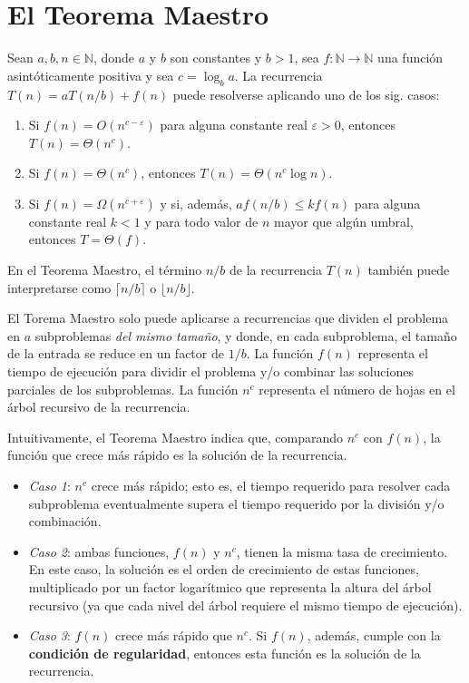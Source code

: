 \newpage
\section{El Teorema Maestro}

\begin{thm}
  Sean \(a,b,n\in\mathbb{N}\), donde \(a\) y \(b\) son constantes y \(b>1\), sea \(f:\mathbb{N}\to\mathbb{N}\) una función asintóticamente positiva y sea \(c=\log_{b}a\). 
  La recurrencia \(T(n)=aT(n/b)+f(n)\) puede resolverse aplicando uno de los sig. casos:
  \begin{enumerate}
    \item Si \(f(n)=O(n^{c-\varepsilon})\) para alguna constante real $\varepsilon>0$, entonces \(T(n)=\Theta(n^{c})\).
    \item Si \(f(n)=\Theta(n^c)\), entonces \(T(n)=\Theta(n^{c}\log{n})\).
    \item Si \(f(n)=\Omega(n^{c+\varepsilon})\) y si, además, \(af(n/b)\leq kf(n)\) para alguna constante real \(k<1\) y para todo valor de \(n\) mayor que algún umbral, entonces \(T=\Theta(f)\).
  \end{enumerate}
\end{thm}

\begin{rem}
  En el Teorema Maestro, el término \(n/b\) de la recurrencia \(T(n)\) también puede interpretarse como \(\lceil n/b\rceil\) o \(\lfloor n/b\rfloor\).
\end{rem}

El Torema Maestro solo puede aplicarse a recurrencias que dividen el problema en \(a\) subproblemas \emph{del mismo tamaño}, y donde, en cada subproblema, el tamaño de la entrada se reduce en un factor de \(1/b\).
La función \(f(n)\) representa el tiempo de ejecución para dividir el problema y/o combinar las soluciones parciales de los subproblemas.
La función \(n^c\) representa el número de hojas en el árbol recursivo de la recurrencia.

Intuitivamente, el Teorema Maestro indica que, comparando \(n^c\) con \(f(n)\), la función que crece más rápido es la solución de la recurrencia.
\begin{itemize}
  \item \textit{Caso 1}: \(n^c\) crece más rápido; esto es, el tiempo requerido para resolver cada subproblema eventualmente supera el tiempo requerido por la división y/o combinación.
  \item \textit{Caso 2}: ambas funciones, \(f(n)\) y \(n^c\), tienen la misma tasa de crecimiento.
  En este caso, la solución es el orden de crecimiento de estas funciones, multiplicado por un factor logarítmico que representa la altura del árbol recursivo (ya que cada nivel del árbol requiere el mismo tiempo de ejecución).
  \item \textit{Caso 3}: \(f(n)\) crece más rápido que \(n^c\). 
  Si \(f(n)\), además, cumple con la \textbf{condición de regularidad}, entonces esta función es la solución de la recurrencia.
\end{itemize}

